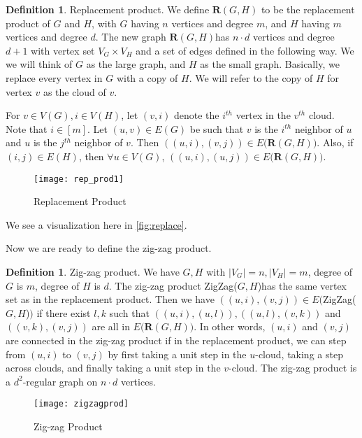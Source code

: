 \documentclass[11pt]{article}
\theoremstyle{definition}
\newtheorem{definition}[theorem]{Definition}
\theoremstyle{definition}
\theoremstyle{definition}
\newcommand{\repprod}
{$\textbf{R}(G, H)$}
\newcommand{\zigzag}
{ZigZag($G, H$)}
\begin{document}
\begin{definition} Replacement product. 
We define $\textbf{R}(G, H)$ to be the replacement
product of $G$ and $H$, with $G$ having $n$ vertices
and degree $m$, and $H$ having $m$ vertices and degree $d$.
The new graph \repprod has $n\cdot d$ vertices and degree $d + 1$ with
vertex set $V_G \times V_H$ and a set of edges defined in the following way.
We we will think of $G$ as the large graph, and $H$ as the small graph. Basically, we replace every vertex in $G$ with a copy of $H$. We will refer to the copy of $H$ for vertex $v$ as the cloud of $v$.

For $v \in V(G), i \in V(H)$, let $(v, i)$ denote the $i^{th}$ vertex in the $v^{th}$ cloud. Note that $i \in [m]$. 
Let $(u, v) \in E(G)$ be such that $v$ is the $i^{th}$ neighbor of $u$ and $u$ is the $j^{th}$ neighbor of $v$. Then $((u, i), (v, j)) \in E($\repprod$)$. Also, if $(i, j) \in E(H)$, then $\forall u \in V(G)$, $((u, i), (u, j)) \in E($\repprod$)$. 
\end{definition}


\begin{figure}
\texttt{[image: rep\_prod1]}
\centering
\caption{Replacement Product}
\label{fig:replace}
\end{figure}

We see a visualization here in \autoref{fig:replace}.

Now we are ready to define the zig-zag product. 

\begin{definition} Zig-zag product. 
We have $G, H$ with $|V_G| = n, |V_H| = m$, degree of $G$ is $m$, degree of $H$ is $d$.
The zig-zag product \zigzag has the same vertex set as in the replacement product. 
Then we have $((u, i), (v, j)) \in E($\zigzag$)$ if there exist $l, k$ such that $((u, i), (u, l)), ((u, l), (v, k))$ and $((v, k), (v, j))$ are all in $E($\repprod$)$. In other words, $(u, i)$ and $(v, j)$ are connected in the zig-zag product if in the replacement product, we can step from $(u, i)$ to $(v, j)$ by first taking a unit step in the $u$-cloud, taking a step across clouds, and finally taking a unit step in the $v$-cloud. The zig-zag product is a $d^2$-regular graph on $n\cdot d$ vertices.
\end{definition}


\begin{figure}
\texttt{[image: zigzagprod]}
\centering
\caption{Zig-zag Product}
\label{fig:zigzag}
\end{figure}
\end{document}
